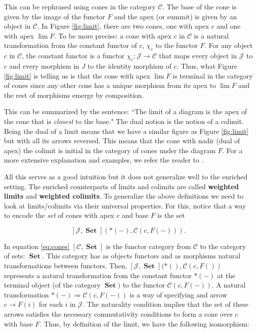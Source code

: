 \documentclass[10pt,a4paper]{elsarticle}
\newcommand{\C}{\mathcal{C}}
\newcommand{\J}{\mathcal{J}}
\newcommand{\Set}{\operatorname{\textbf{Set}}}
\begin{document}
{	This can be rephrased using cones in the category $\C$. The base of the cone is given by the image of the functor $F$ and the apex (or summit) is given by an object in $\C$. In Figure \ref{fig:limit}, there are two cones, one with apex $c$ and one with apex $\lim F$. To be more precise: a cone with apex $c$ in $\C$ is a natural transformation from the constant functor of $c$, $\chi_{c}$ to the functor $F$. For any object $c$ in $\C$, the constant functor is a functor $\chi_{c}\colon\J\to \C$ that maps every object in $\J$ to $c$ and every morphism in $J$ to the identity morphism of $c$. Thus, what Figure \ref{fig:limit} is telling us is that the cone with apex $\lim F$ is terminal in the category of cones since any other cone has a unique morphism from its apex to $\lim F$ and the rest of morphisms emerge by composition.
	
	This can be summarized by the sentence: ``The limit of a diagram is the apex of the cone that is \textit{closest} to the base." The dual notion is the notion of a colimit. Being the dual of a limit means that we have a similar figure as Figure \ref{fig:limit} but with all its arrows reversed. This means that the cone with nadir (dual of apex) the colimit is initial in the category of cones under the diagram $F$. For a more extensive explanation and examples, we refer the reader to \cite[Chapter 3 ]{riehl2017category}.
	
	All this serves as a good intuition but it does not generalize well to the enriched setting. The enriched counterparts of limits and colimits are called \textbf{weighted limits} and \textbf{weighted colimits}. To generalize the above definitions we need to look at limits/colimits via their universal properties. For this, notice that a way to encode the \textit{set} of cones with apex $c$ and base $F$ is the set
	
	\begin{equation}\label{eq:cones}
		[\J, \Set](*(-),\C(c,F(-))).
	\end{equation}
	
	In equation \eqref{eq:cones} $[\C,\Set]$ is the functor category from $\C$ to the category of sets: $\Set$. This category has as objects functors and as morphisms natural transformations between functors. Then, $[\J,\Set](*(),\C(c,F())$ represents a natural transformation from the constant functor $*(-)$ at the terminal object (of the category $\Set)$ to the functor $\C(c,F(-))$. A natural transformation $*(-)\Rightarrow \C(c,F(-))$ is a way of specifying and arrow $c\to F(i)$ for each $i$ in $\J$. The naturality condition implies that the set of these arrows satisfies the necessary commutativity conditions to form a cone over $c$ with base $F$. Thus, by definition of the limit, we have the following isomorphism:
	
}
\end{document}
